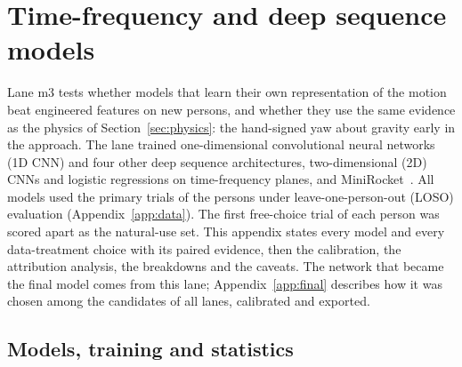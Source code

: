 \section{Time-frequency and deep sequence models}\label{app:m3}

Lane m3 tests whether models that learn their own representation of the motion beat engineered features on new persons, and whether they use the same evidence as the physics of Section~\ref{sec:physics}: the hand-signed yaw about gravity early in the approach.
The lane trained one-dimensional convolutional neural networks (1D CNN) and four other deep sequence architectures, two-dimensional (2D) CNNs and logistic regressions on time-frequency planes, and MiniRocket~\cite{dempster2021minirocket}.
All models used the  primary trials of the  persons under leave-one-person-out (LOSO) evaluation (Appendix~\ref{app:data}).
The first free-choice trial of each person was scored apart as the natural-use set.
This appendix states every model and every data-treatment choice with its paired evidence, then the calibration, the attribution analysis, the breakdowns and the caveats.
The network that became the final model comes from this lane; Appendix~\ref{app:final} describes how it was chosen among the candidates of all lanes, calibrated and exported.

\subsection{Models, training and statistics}\label{app:m3:models}

